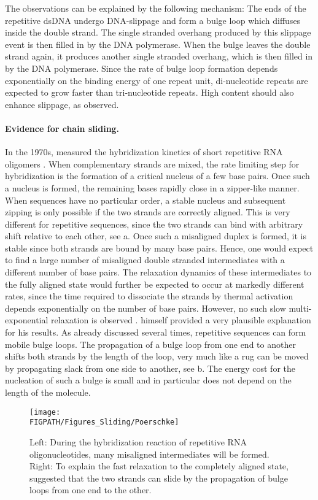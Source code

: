 The observations can be explained by the following mechanism: 
The ends of the repetitive dsDNA undergo DNA-slippage and 
form a bulge loop which diffuses inside the double strand. The single stranded overhang
produced by this slippage event is then filled in by the DNA polymerase. When the
bulge leaves the double strand again, it
produces another single stranded overhang, which is then filled in by the
DNA polymerase. Since the rate of bulge loop formation depends exponentially on the 
binding energy of one repeat unit, di-nucleotide repeats are expected to grow faster than 
tri-nucleotide repeats. High  content should also enhance slippage, as observed.

\paragraph{\label{sec:Poerschke}Evidence for chain sliding.}
In the 1970s, \citeauthor{Poerschke_BioPhysChem_74a} measured the hybridization kinetics
of short repetitive RNA oligomers \cite{Poerschke_BioPhysChem_74a}. 
When complementary strands are mixed, the rate limiting
step for hybridization is the formation of a critical nucleus of a few base pairs. Once such a 
nucleus is formed, the remaining bases rapidly close in a zipper-like manner. When sequences
have no particular order, a stable nucleus and subsequent zipping is only possible if the 
two strands are correctly aligned. This is very different for repetitive sequences,
since the two strands can bind with arbitrary shift relative to each other, see a. 
Once such a misaligned duplex is formed, it is stable since both strands are bound by many 
base pairs. Hence, one would expect to find a large number of 
misaligned double stranded intermediates with a different number of base pairs.
The relaxation dynamics of these intermediates to the fully aligned state 
would further be expected to occur at markedly different rates, since 
the time required to dissociate the strands by thermal activation depends exponentially on the
number of base pairs. However, no such slow multi-exponential relaxation is observed 
\cite{Poerschke_BioPhysChem_74a}. 
\citeauthor{Poerschke_BioPhysChem_74a} himself provided a very plausible explanation 
for his results. As already discussed several times, repetitive sequences can form mobile
bulge loops. The propagation of a bulge loop from one end to another shifts both 
strands by the length of the loop, very much 
like a rug can be moved by propagating slack from one side to another, see b. 
The energy cost for the nucleation of such a bulge is small and in particular does not depend
on the length of the molecule. 
\begin{figure}
\centering
\texttt{[image: \\FIGPATH/Figures\_Sliding/Poerschke]}
\caption[Evidence for fast chain sliding reaction.]{\label{fig:Poerschke}
Left: During the hybridization reaction of repetitive RNA oligonucleotides, many misaligned 
intermediates will be formed. Right: To explain the fast relaxation to the 
completely aligned state, \citeauthor{Poerschke_BioPhysChem_74a} suggested 
that the two strands can slide by the propagation of bulge loops from one end to the other.  
}
\end{figure}


